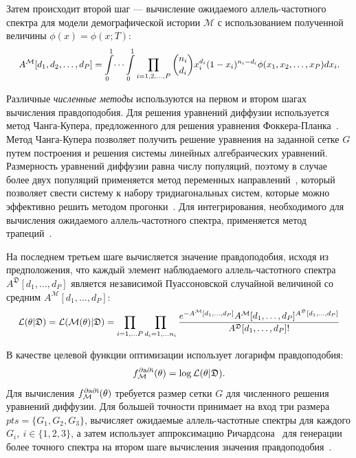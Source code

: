 Затем происходит второй шаг --- вычисление ожидаемого аллель-частотного спектра для модели демографической истории $\mathcal{M}$ с использованием полученной величины $\phi(x) = \phi(x; T)$:
$$
\scalemath{0.95}{
A^\mathcal{M}[d_1, d_2, \dots, d_P] = \int\limits_0^1 \dots \int\limits_0^1 \prod\limits_{i=1,2,\dots,P} \binom{n_i}{d_i} x_i^{d_i} (1 - x_i)^{n_i - d_i} \phi(x_1, x_2, \dots, x_P) dx_i.
}
$$

Различные \textit{численные методы} используются на первом и втором шагах вычисления правдоподобия.
Для решения уравнений диффузии используется метод Чанга-Купера, предложенного для решения уравнения Фоккера-Планка~\cite{chang1970practical}. 
Метод Чанга-Купера позволяет получить решение уравнения на заданной сетке $G$ путем построения и решения системы линейных алгебраических уравнений.
Размерность уравнений диффузии равна числу популяций, поэтому в случае более двух популяций применяется метод переменных направлений~\cite{peaceman1955numerical, press2007numerical}, который позволяет свести систему к набору тридиагональных систем, которые можно эффективно решить методом прогонки~\cite{березин1962методы}.
Для интегрирования, необходимого для вычисления ожидаемого аллель-частотного спектра, применяется метод трапеций~\cite{демидович1963основы}.

На последнем третьем шаге вычисляется значение правдоподобия, исходя из предположения, что каждый элемент наблюдаемого аллель-частотного спектра $A^{\mathfrak{D}}[d_1, \dots, d_P]$ является независимой Пуассоновской случайной величиной со средним $A^{\mathcal{M}}[d_1, \dots, d_P]$:
\begin{equation*}
    \scalemath{0.95}{
    \mathcal{L}(\theta |\mathfrak{D}) = \mathcal{L}(\mathcal{M} (\theta)|\mathfrak{D}) = \prod_{i=1,\ldots P}\prod_{d_i=1,\ldots n_i} \frac{e^{-A^{\mathcal{M}}[d_1,\ldots,d_P]} A^{\mathcal{M}}[d_1,\ldots,d_P]^{A^\mathfrak{D}[d_1,\ldots,d_P]}}{A^\mathfrak{D}[d_1,\ldots,d_P]!}
    }
\end{equation*}

В качестве целевой функции оптимизации \dadi использует логарифм правдоподобия:
$$f^{\text{$\partial$a$\partial$i}}_\mathcal{M}(\theta) = \log \mathcal{L}(\theta|\mathfrak{D}).$$
Для вычисления $f^{\text{$\partial$a$\partial$i}}_\mathcal{M}(\theta)$ \dadi требуется размер сетки $G$ для численного решения уравнений диффузии.
Для большей точности \dadi принимает на вход три размера $pts = \{G_1, G_2, G_3\}$, вычисляет ожидаемые аллель-частотные спектры для каждого $G_i,\ i \in \{1, 2, 3\}$, а затем использует аппроксимацию Ричардсона~\cite{ziegel1987numerical} для генерации более точного спектра на втором шаге вычисления значения правдоподобия~\cite{gutenkunst2009inferring}.

